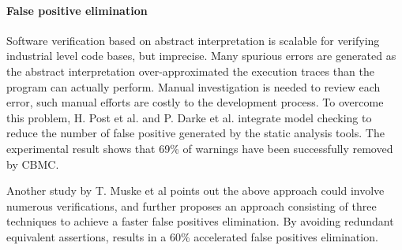 \paragraph{False positive elimination}
Software verification based on abstract interpretation is scalable for verifying industrial level code bases, but imprecise. Many spurious errors are generated as the abstract interpretation over-approximated the execution traces than the program can actually perform. Manual investigation is needed to review each error, such manual efforts are costly to the development process. To overcome this problem, 
H. Post et al. \cite{4639322} and P. Darke et al. \cite{Kumar:2013:PRA:2491411.2494569} integrate model checking to reduce the number of false positive generated by the static analysis tools. The experimental result shows that 69\% of warnings have been successfully removed by CBMC. 


Another study by T. Muske et al \cite{tukaram2013efficient} points out the above approach could involve numerous verifications, and further proposes an approach consisting of three techniques to achieve a faster false positives elimination. By avoiding redundant equivalent assertions, results in a 60\% accelerated false positives elimination. 




